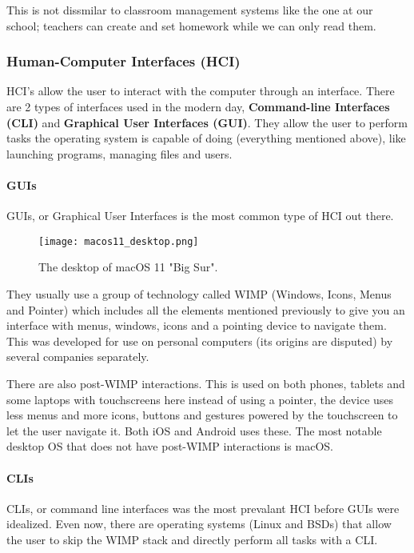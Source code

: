 \documentclass[../main.tex]{subfiles}
\begin{document}
This is not dissmilar to classroom management systems like the one at our school; teachers can create and set homework while we can only read them.

\subsubsection{Human-Computer Interfaces (HCI)}

HCI's allow the user to interact with the computer through an interface. There are 2 types of interfaces used in the modern day, \textbf{Command-line Interfaces (CLI)} and \textbf{Graphical User Interfaces (GUI)}. They allow the user to perform tasks the operating system is capable of doing (everything mentioned above), like launching programs, managing files and users. 

\paragraph{GUIs}

GUIs, or Graphical User Interfaces is the most common type of HCI out there.

\begin{figure}[H]
    \centering
    \texttt{[image: macos11\_desktop.png]}
    \caption{The desktop of macOS 11 "Big Sur".}
    \label{fig:macos11:desktop}
\end{figure}

They usually use a group of technology called WIMP (Windows, Icons, Menus and Pointer) which includes all the elements mentioned previously to give you an interface with menus, windows, icons and a pointing device to navigate them. This was developed for use on personal computers (its origins are disputed) by several companies separately.

There are also post-WIMP interactions. This is used on both phones, tablets and some laptops with touchscreens here instead of using a pointer, the device uses less menus and more icons, buttons and gestures powered by the touchscreen to let the user navigate it. Both iOS and Android uses these. The most notable desktop OS that does not have post-WIMP interactions is macOS.

\paragraph{CLIs}

CLIs, or command line interfaces was the most prevalant HCI before GUIs were idealized. Even now, there are operating systems (Linux and BSDs) that allow the user to skip the WIMP stack and directly perform all tasks with a CLI.
\end{document}
